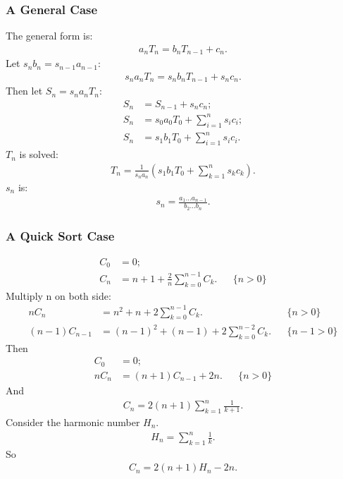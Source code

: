 \documentclass{article}
\begin{document}
\subsubsection{A General Case}
The general form is:
\begin{align}
a_nT_n = b_nT_{n-1}+c_n.
\end{align}
Let $s_nb_n = s_{n-1}a_{n-1}$:
\begin{align}
s_na_nT_n =s_nb_nT_{n-1}+s_nc_n.
\end{align}
Then let $S_n = s_na_nT_n$:
\begin{align}
S_n &= S_{n-1}+s_nc_n;\\
S_n &= s_0a_0T_0 + \sum_{i=1}^{n}{s_ic_i};\\
S_n &= s_1b_1T_0 + \sum_{i=1}^{n}{s_ic_i}.
\end{align}
$T_n$ is solved:
\begin{align}
T_n = \frac{1}{s_na_n}(s_1b_1T_0 + \sum_{k=1}^{n}{s_kc_k}).
\end{align}
$s_n$ is:
\begin{align}
s_n = \frac{a_1...a_{n-1}}{b_2...b_{n}}.
\end{align}

\subsubsection{A Quick Sort Case}
\begin{align}
C_0 &= 0;\\
C_n &= n+1+\frac{2}{n}\sum_{k=0}^{n-1}{C_k}. && \{n>0\}
\end{align}
Multiply n on both side:
\begin{align}
nC_n &= n^2+n+2\sum_{k=0}^{n-1}{C_k}. && \{n>0\}\\
(n-1)C_{n-1} &= (n-1)^2+(n-1)+2\sum_{k=0}^{n-2}{C_k}. && \{n-1>0\}
\end{align}
Then
\begin{align}
C_0 &= 0;\\
nC_n &= (n+1)C_{n-1} + 2n. && \{n>0\}
\end{align}
And
\begin{align}
C_n = 2(n+1)\sum_{k=1}^{n}{\frac{1}{k+1}}.
\end{align}
Consider the harmonic number $H_n$.
\begin{align}
H_n = \sum_{k=1}^{n}{\frac{1}{k}}.
\end{align}
So
\begin{align}
C_n = 2(n+1)H_n - 2n.
\end{align}
\end{document}
